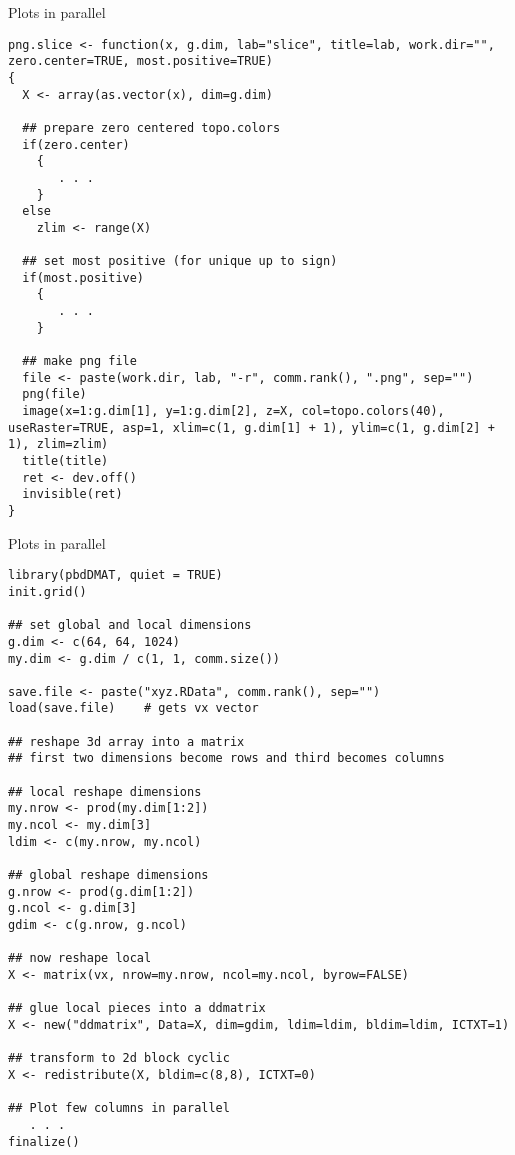 \begin{frame}
  \begin{exampleblock}{Plots in parallel}\pause
\begin{lstlisting}[title=png.slice]
png.slice <- function(x, g.dim, lab="slice", title=lab, work.dir="", zero.center=TRUE, most.positive=TRUE)
{
  X <- array(as.vector(x), dim=g.dim)

  ## prepare zero centered topo.colors
  if(zero.center)
    {
       . . .
    }
  else
    zlim <- range(X)

  ## set most positive (for unique up to sign)
  if(most.positive)
    {
       . . .
    }
  
  ## make png file
  file <- paste(work.dir, lab, "-r", comm.rank(), ".png", sep="")
  png(file)
  image(x=1:g.dim[1], y=1:g.dim[2], z=X, col=topo.colors(40), useRaster=TRUE, asp=1, xlim=c(1, g.dim[1] + 1), ylim=c(1, g.dim[2] + 1), zlim=zlim)
  title(title)
  ret <- dev.off()
  invisible(ret)
}
\end{lstlisting}
  \end{exampleblock}
\end{frame}


\begin{frame}
  \begin{exampleblock}{Plots in parallel}\pause
\begin{lstlisting}[title=Getting the Data]
library(pbdDMAT, quiet = TRUE)
init.grid()

## set global and local dimensions
g.dim <- c(64, 64, 1024)
my.dim <- g.dim / c(1, 1, comm.size())

save.file <- paste("xyz.RData", comm.rank(), sep="")
load(save.file)    # gets vx vector

## reshape 3d array into a matrix
## first two dimensions become rows and third becomes columns

## local reshape dimensions
my.nrow <- prod(my.dim[1:2])
my.ncol <- my.dim[3]
ldim <- c(my.nrow, my.ncol)

## global reshape dimensions
g.nrow <- prod(g.dim[1:2])
g.ncol <- g.dim[3]
gdim <- c(g.nrow, g.ncol)

## now reshape local
X <- matrix(vx, nrow=my.nrow, ncol=my.ncol, byrow=FALSE)

## glue local pieces into a ddmatrix
X <- new("ddmatrix", Data=X, dim=gdim, ldim=ldim, bldim=ldim, ICTXT=1)

## transform to 2d block cyclic
X <- redistribute(X, bldim=c(8,8), ICTXT=0)

## Plot few columns in parallel
   . . .
finalize()
\end{lstlisting}
  \end{exampleblock}
\end{frame}


